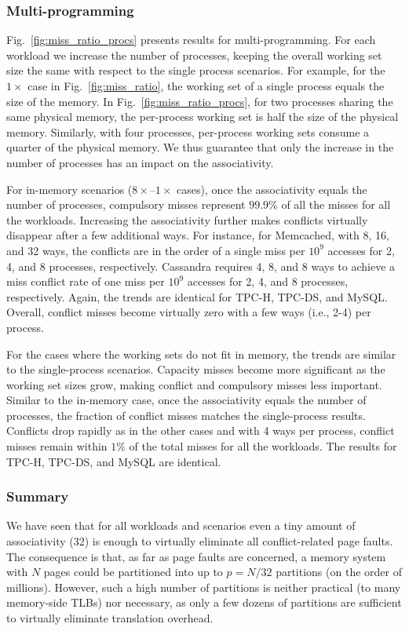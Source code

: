 \subsubsection{Multi-programming}
Fig.~\ref{fig:miss_ratio_procs} presents results for multi-programming. For each workload we increase the number of processes, keeping the overall working set size the same with respect to the single process scenarios. For example, for the $1\times$ case in Fig.~\ref{fig:miss_ratio}, the working set of a single process equals the size of the memory. In Fig.~\ref{fig:miss_ratio_procs}, for two processes sharing the same physical memory, the per-process working set is half the size of the physical memory. Similarly, with four processes, per-process working sets consume a quarter of the physical memory. We thus guarantee that only the increase in the number of processes has an impact on the associativity. 

For in-memory scenarios ($8\times$--$1\times$ cases), once the associativity equals the number of processes, compulsory misses represent $99.9\%$ of all the misses for all the workloads. Increasing the associativity further makes conflicts virtually disappear after a few additional ways. For instance, for Memcached, with 8, 16, and 32 ways, the conflicts are in the order of a single miss per $10^{9}$ accesses for 2, 4, and 8 processes, respectively. Cassandra requires 4, 8, and 8 ways to achieve a miss conflict rate of one miss per $10^{9}$ accesses for 2, 4, and 8 processes, respectively. Again, the trends are identical for TPC-H, TPC-DS, and MySQL. Overall, conflict misses become virtually zero with a few ways (i.e., 2-4) per process.

For the cases where the working sets do not fit in memory, the trends are similar to the single-process scenarios. Capacity misses become more significant as the working set sizes grow, making conflict and compulsory misses less important. Similar to the in-memory case, once the associativity equals the number of processes, the fraction of conflict misses matches the single-process results. Conflicts drop rapidly as in the other cases and with 4 ways per process, conflict misses remain within $1\%$ of the total misses for all the workloads. The results for TPC-H, TPC-DS, and MySQL are identical.

\subsubsection{Summary}
We have seen that for all workloads and scenarios even a tiny amount of associativity (32) is enough to virtually eliminate all conflict-related page faults. The consequence is that, as far as page faults are concerned, a memory system with $N$ pages could be partitioned into up to $p=N/32$ partitions (on the order of millions). However, such a high number of partitions is neither practical (to many memory-side TLBs) nor necessary, as only a few dozens of partitions are sufficient to virtually eliminate translation overhead. 


